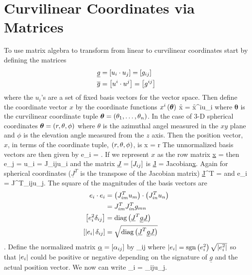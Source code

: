 \chapter{Curvilinear Coordinates via Matrices}
To use matrix algebra to transform from linear to curvilinear coordinates start by defining the matrices
\begin{align}
	\underline{g} &= \left [ {u_{i}\cdot u_{j}}\right ] = \left [ {g_{ij}}\right ] \\
	\overline{g} &= \left [ {u^{i}\cdot u^{j}}\right ] = \left [ {g^{ij}}\right ]
\end{align}
where the $u_{i}$'s are a set of fixed basis vectors for the vector space.  Then define the coordinate vector $x$ by the coordinate functions ${x^{i}}\left ( {\bm{\theta}} \right )$ 
\be
	\f{x}{\bm{\theta}} = \f{x^{i}}{\bm{\theta}}u_{i}
\ee
where $\bm{\theta}$ is the curvilinear coordinate tuple $\bm{\theta} = \left ( {\theta_{1},\dots,\theta_{n}} \right )$.  In the case of 3-D spherical coordinates 
$\bm{\theta} = \left ( {r,\theta,\phi} \right )$ where $\theta$ is the azimuthal angel measured in the $xy$ plane and $\phi$ is the elevation angle measured from 
the $z$ axis.  Then the position vector, $x$, in terms of the coordinate tuple, $\left ( {r,\theta,\phi} \right )$, is 
\be
	x = r 
\ee
The unnormalized basis vectors are then given by
\be
	e_{i} = .
\ee
If we represent $x$ as the row matrix
\be
	\underline{x} = 
\ee
then
\be
	e_{j} = u_{i} = J_{ij}u_{i}
\ee
and the matrix $\underline{J} = \left [ {J_{ij}}\right ]$ is
\be
	\underline{J} = \f{\mbox{Jacobian}}{\underline{x}}.
\ee
Again for spherical coordinates ($\underline{J}^{T}$ is the transpose of the Jacobian matrix)
\be
\underline{J}^{T} = 
\ee
and
\be
	e_{i} = J^{T}_{ij}u_{j}.
\ee
The square of the magnitudes of the basis vectors are
\begin{align}
	e_{i}\cdot e_{i} &= \left ( {J^{T}_{im}u_{m}} \right )\cdot\left ( {J^{T}_{in}u_{n}} \right )	\\
	                 &= J^{T}_{im}J^{T}_{in}g_{mn}	\\
	\left [ {e_{i}^{2}\delta_{ij}}\right ] &= {\mbox{diag}}\left ( {\underline{J}^{T}\underline{g}\underline{J}} \right ) \\
	\left [ {\left | {e_{i}} \right |\delta_{ij}}\right ] &= \sqrt{{\mbox{diag}}\left ( {\underline{J}^{T}\underline{g}\underline{J}} \right )}
\end{align}.
Define the normalized matrix $\underline{\alpha} = \left [ {\alpha_{ij}}\right ]$ by
\be
	\alpha_{ij} \equiv {}
\ee
where $\left | {e_{i}} \right | = {\mbox{sgn}}\left ( {e_{i}^{2}} \right )\sqrt{\left | {e_{i}^{2}} \right |}$ so that $\left | {e_{i}} \right |$ could be positive
or negative depending on the signature of $\underline{g}$ and the actual position vector.  We now can 
write
\be
	_{i} = \alpha_{ij}u_{j}.
\ee

